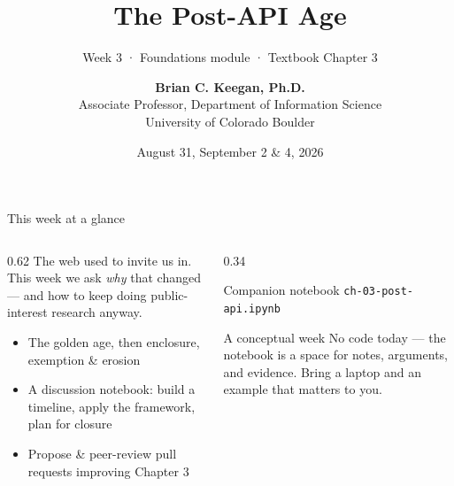 \documentclass[9pt,aspectratio=169]{beamer}
\title[Week 3 · Post-API Age]{{\Huge The Post-API Age}}
\subtitle{Week 3 · Foundations module · Textbook Chapter 3}
\author[Keegan]{\textbf{Brian C. Keegan, Ph.D.} \\ Associate Professor, Department of Information Science \\ University of Colorado Boulder}
\date{August 31, September 2 \& 4, 2026}
\begin{document}
\maketitle

\begin{frame}{This week at a glance}
    \begin{columns}[T]
        \begin{column}{0.62\textwidth}
            The web used to invite us in. This week we ask \textit{why} that changed --- and how to keep doing public-interest research anyway.

            \vspace{1em}

            \begin{itemize}\small
                \item The golden age, then enclosure, exemption \& erosion
            \end{itemize}

            \vspace{0.5em}

            \begin{itemize}\small
                \item A discussion notebook: build a timeline, apply the framework, plan for closure
            \end{itemize}

            \vspace{0.5em}

            \begin{itemize}\small
                \item Propose \& peer-review pull requests improving Chapter 3
            \end{itemize}
        \end{column}
        \begin{column}{0.34\textwidth}
            \begin{block}{Companion notebook}
                \footnotesize \texttt{ch-03-post-api.ipynb}
            \end{block}
            \begin{alertblock}{A conceptual week}
                \footnotesize No code today --- the notebook is a space for notes, arguments, and evidence. Bring a laptop and an example that matters to you.
            \end{alertblock}
        \end{column}
    \end{columns}
\end{frame}
\end{document}
